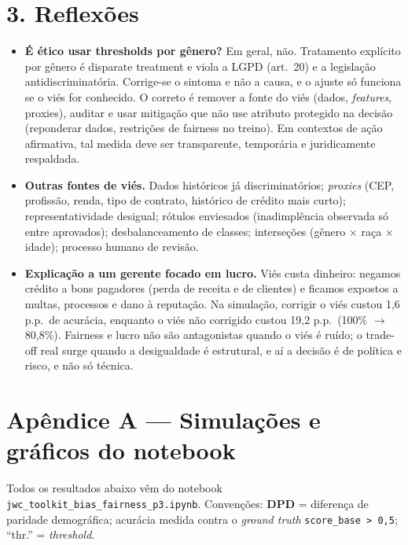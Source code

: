 \documentclass[10pt,a4paper]{article}
\begin{document}
\section*{3. Reflex\~oes}
\begin{itemize}
  \item \textbf{\'E \'etico usar thresholds por g\^enero?} Em geral, n\~ao. Tratamento expl\'icito por g\^enero \'e disparate treatment e viola a LGPD (art.~20) e a legisla\c{c}\~ao antidiscriminat\'oria. Corrige-se o sintoma e n\~ao a causa, e o ajuste s\'o funciona se o vi\'es for conhecido. O correto \'e remover a fonte do vi\'es (dados, \textit{features}, proxies), auditar e usar mitiga\c{c}\~ao que n\~ao use atributo protegido na decis\~ao (reponderar dados, restri\c{c}\~oes de fairness no treino). Em contextos de a\c{c}\~ao afirmativa, tal medida deve ser transparente, tempor\'aria e juridicamente respaldada.
  \item \textbf{Outras fontes de vi\'es.} Dados hist\'oricos j\'a discriminat\'orios; \textit{proxies} (CEP, profiss\~ao, renda, tipo de contrato, hist\'orico de cr\'edito mais curto); representatividade desigual; r\'otulos enviesados (inadimpl\^encia observada s\'o entre aprovados); desbalanceamento de classes; interse\c{c}\~oes (g\^enero $\times$ ra\c{c}a $\times$ idade); processo humano de revis\~ao.
  \item \textbf{Explica\c{c}\~ao a um gerente focado em lucro.} Vi\'es custa dinheiro: negamos cr\'edito a bons pagadores (perda de receita e de clientes) e ficamos expostos a multas, processos e dano \`a reputa\c{c}\~ao. Na simula\c{c}\~ao, corrigir o vi\'es custou 1,6 p.p.\ de acur\'acia, enquanto o vi\'es n\~ao corrigido custou 19,2 p.p.\ (100\% $\to$ 80,8\%). Fairness e lucro n\~ao s\~ao antagonistas quando o vi\'es \'e ru\'ido; o trade-off real surge quando a desigualdade \'e estrutural, e a\'i a decis\~ao \'e de pol\'itica e risco, e n\~ao s\'o t\'ecnica.
\end{itemize}


\newpage
\section*{Ap\^endice A --- Simula\c{c}\~oes e gr\'aficos do notebook}
Todos os resultados abaixo v\^em do notebook \texttt{jwc\_toolkit\_bias\_fairness\_p3.ipynb}. Convenções: \textbf{DPD} = diferen\c{c}a de paridade demogr\'afica; acur\'acia medida contra o \textit{ground truth} \texttt{score\_base > 0,5}; ``thr.'' = \textit{threshold}.
\end{document}
